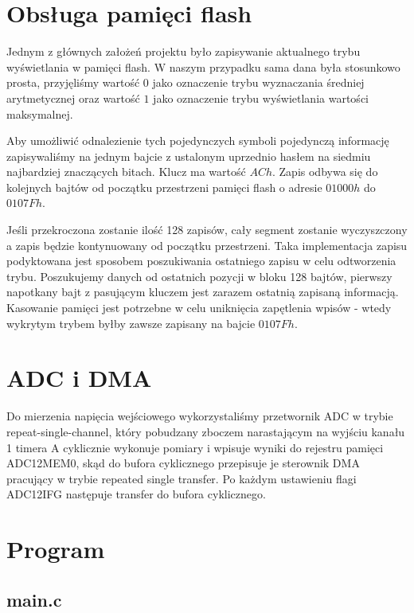 \documentclass[fleqn]{article}
\begin{document}
\pagebreak
\section{Obsługa pamięci flash}
Jednym z głównych założeń projektu było zapisywanie aktualnego trybu wyświetlania w pamięci flash. W naszym przypadku sama dana była stosunkowo prosta, przyjęliśmy wartość $0$ jako oznaczenie trybu wyznaczania średniej arytmetycznej oraz wartość $1$ jako oznaczenie trybu wyświetlania wartości maksymalnej.

Aby umożliwić odnalezienie tych pojedynczych symboli pojedynczą informację zapisywaliśmy na jednym bajcie z ustalonym uprzednio hasłem na siedmiu najbardziej znaczących bitach. Klucz ma wartość $ACh$. Zapis odbywa się do kolejnych bajtów od początku przestrzeni pamięci flash o adresie $01000h$ do $0107Fh$.

Jeśli przekroczona zostanie ilość 128 zapisów, cały segment zostanie wyczyszczony a zapis będzie kontynuowany od początku przestrzeni. Taka implementacja zapisu podyktowana jest sposobem poszukiwania ostatniego zapisu w celu odtworzenia trybu. Poszukujemy danych od ostatnich pozycji w bloku 128 bajtów, pierwszy napotkany bajt z pasującym kluczem jest zarazem ostatnią zapisaną informacją. Kasowanie pamięci jest potrzebne w celu uniknięcia zapętlenia wpisów - wtedy wykrytym trybem byłby zawsze zapisany na bajcie $0107Fh$.

\section{ADC i DMA}
Do mierzenia napięcia wejściowego wykorzystaliśmy przetwornik ADC w trybie repeat-single-channel, który pobudzany zboczem narastającym na wyjściu kanału 1 timera A cyklicznie wykonuje pomiary i wpisuje wyniki do rejestru pamięci ADC12MEM0, skąd do bufora cyklicznego przepisuje je sterownik DMA pracujący w trybie repeated single transfer. Po każdym ustawieniu flagi ADC12IFG następuje transfer do bufora cyklicznego.



\section{Program}
\subsection{main.c}

\begin{minipage}[t]{.49\textwidth}
	
\end{minipage}\hfill
\noindent\begin{minipage}[t]{.49\textwidth}
	
\end{minipage}\hfill
\end{document}
